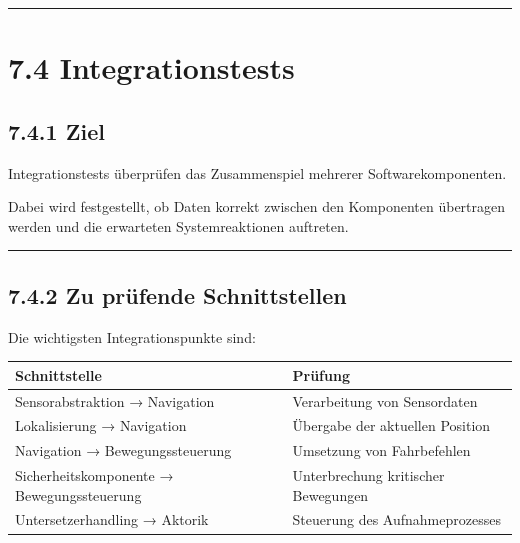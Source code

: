 \documentclass[
]{article}
\begin{document}
\begin{center}\rule{0.5\linewidth}{0.5pt}\end{center}

\section{7.4 Integrationstests}\label{integrationstests-1}

\subsection{7.4.1 Ziel}\label{ziel-1}

Integrationstests überprüfen das Zusammenspiel mehrerer
Softwarekomponenten.

Dabei wird festgestellt, ob Daten korrekt zwischen den Komponenten
übertragen werden und die erwarteten Systemreaktionen auftreten.

\begin{center}\rule{0.5\linewidth}{0.5pt}\end{center}

\subsection{7.4.2 Zu prüfende
Schnittstellen}\label{zu-pruxfcfende-schnittstellen}

Die wichtigsten Integrationspunkte sind:

\begin{longtable}[]{@{}
  >{\raggedright\arraybackslash}p{}
  >{\raggedright\arraybackslash}p{}@{}}
\toprule\noalign{}
\begin{minipage}[b]{\linewidth}\raggedright
Schnittstelle
\end{minipage} & \begin{minipage}[b]{\linewidth}\raggedright
Prüfung
\end{minipage} \\
\midrule\noalign{}
\endhead
\bottomrule\noalign{}
\endlastfoot
Sensorabstraktion → Navigation & Verarbeitung von Sensordaten \\
Lokalisierung → Navigation & Übergabe der aktuellen Position \\
Navigation → Bewegungssteuerung & Umsetzung von Fahrbefehlen \\
Sicherheitskomponente → Bewegungssteuerung & Unterbrechung kritischer
Bewegungen \\
Untersetzerhandling → Aktorik & Steuerung des Aufnahmeprozesses \\
\end{longtable}
\end{document}
